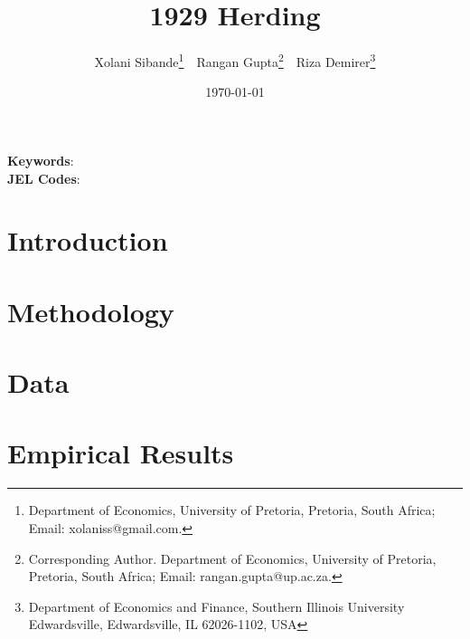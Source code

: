 \documentclass[
  12,
]{article}
\author{}
\date{\vspace{-2.5em}}
\begin{document}
\title{1929 Herding}


\author { Xolani Sibande\footnote{Department of Economics, University of Pretoria, Pretoria, South Africa; Email: xolaniss@gmail.com.} \,\, 
Rangan Gupta\footnote{Corresponding Author. Department of Economics, University of Pretoria, Pretoria, South Africa; Email: rangan.gupta@up.ac.za.} \,\,
Riza Demirer\footnote{Department of Economics and Finance, Southern Illinois University Edwardsville, Edwardsville, IL 62026-1102, USA}}
\date{\today}
\maketitle

\begin{abstract}


\end{abstract}

\noindent\textbf{Keywords}:   \\
\textbf{JEL Codes}: 
\newpage

\hypertarget{introduction}{%
\section{Introduction}\label{introduction}}

\hypertarget{methodology}{%
\section{Methodology}\label{methodology}}

\citet{sim2015oil}

\hypertarget{data}{%
\section{Data}\label{data}}

\newpage

\hypertarget{empirical-results}{%
\section{Empirical Results}\label{empirical-results}}

\providecommand{\docline}[3]{\noalign{\global\setlength{\arrayrulewidth}{#1}}\arrayrulecolor[HTML]{#2}\cline{#3}}

\setlength{\tabcolsep}{0pt}

\renewcommand*{\arraystretch}{1.5}
\end{document}
